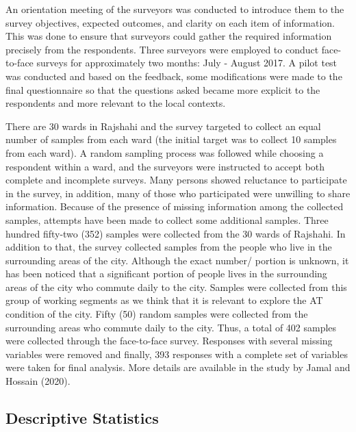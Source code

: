 \documentclass[]{elsarticle} %
\begin{document}
An orientation meeting of the surveyors was conducted to introduce them
to the survey objectives, expected outcomes, and clarity on each item of
information. This was done to ensure that surveyors could gather the
required information precisely from the respondents. Three surveyors
were employed to conduct face-to-face surveys for approximately two
months: July - August 2017. A pilot test was conducted and based on the
feedback, some modifications were made to the final questionnaire so
that the questions asked became more explicit to the respondents and
more relevant to the local contexts.

There are 30 wards in Rajshahi and the survey targeted to collect an
equal number of samples from each ward (the initial target was to
collect 10 samples from each ward). A random sampling process was
followed while choosing a respondent within a ward, and the surveyors
were instructed to accept both complete and incomplete surveys. Many
persons showed reluctance to participate in the survey, in addition,
many of those who participated were unwilling to share information.
Because of the presence of missing information among the collected
samples, attempts have been made to collect some additional samples.
Three hundred fifty-two (352) samples were collected from the 30 wards
of Rajshahi. In addition to that, the survey collected samples from the
people who live in the surrounding areas of the city. Although the exact
number/ portion is unknown, it has been noticed that a significant
portion of people lives in the surrounding areas of the city who commute
daily to the city. Samples were collected from this group of working
segments as we think that it is relevant to explore the AT condition of
the city. Fifty (50) random samples were collected from the surrounding
areas who commute daily to the city. Thus, a total of 402 samples were
collected through the face-to-face survey. Responses with several
missing variables were removed and finally, 393 responses with a
complete set of variables were taken for final analysis. More details
are available in the study by Jamal and Hossain (2020).

\hypertarget{descriptive-statistics}{%
\subsection{Descriptive Statistics}\label{descriptive-statistics}}
\end{document}
